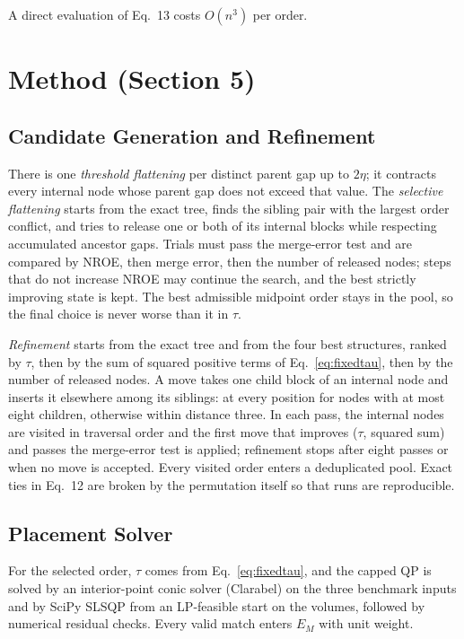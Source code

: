 \documentclass[preprint]{vgtc}
\begin{document}
A direct evaluation of Eq.~13 costs $O(n^3)$ per order.

\section{Method (Section 5)}\label{sec:construction}
\subsection{Candidate Generation and Refinement}
There is one \emph{threshold flattening} per distinct parent gap up to $2\eta$; it contracts every internal node whose parent gap does not exceed that value. The \emph{selective flattening} starts from the exact tree, finds the sibling pair with the largest order conflict, and tries to release one or both of its internal blocks while respecting accumulated ancestor gaps. Trials must pass the merge-error test and are compared by NROE, then merge error, then the number of released nodes; steps that do not increase NROE may continue the search, and the best strictly improving state is kept. The best admissible midpoint order stays in the pool, so the final choice is never worse than it in $\tau$.

\emph{Refinement} starts from the exact tree and from the four best structures, ranked by $\tau$, then by the sum of squared positive terms of Eq.~\ref{eq:fixedtau}, then by the number of released nodes. A move takes one child block of an internal node and inserts it elsewhere among its siblings: at every position for nodes with at most eight children, otherwise within distance three. In each pass, the internal nodes are visited in traversal order and the first move that improves ($\tau$, squared sum) and passes the merge-error test is applied; refinement stops after eight passes or when no move is accepted. Every visited order enters a deduplicated pool. Exact ties in Eq.~12 are broken by the permutation itself so that runs are reproducible.

\subsection{Placement Solver}
For the selected order, $\tau$ comes from Eq.~\ref{eq:fixedtau}, and the capped QP is solved by an interior-point conic solver (Clarabel) on the three benchmark inputs and by SciPy SLSQP from an LP-feasible start on the volumes, followed by numerical residual checks. Every valid match enters $E_M$ with unit weight.
\end{document}

